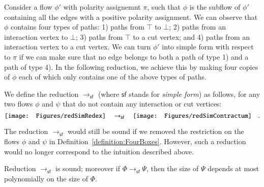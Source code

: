 Consider a flow $\phi'$ with polarity assignemnt $\pi$, such that $\phi$ is the subflow of $\phi'$ containing all the edges with a positive polarity assignment. We can observe that $\phi$ contains four types of paths: 1) paths from $\top$ to $\bot$; 2) paths from an interaction vertex to $\bot$; 3) paths from $\top$ to a cut vertex; and 4) paths from an interaction vertex to a cut vertex. We can turn $\phi'$ into simple form with respect to $\pi$ if we can make sure that no edge belongs to both a path of type 1) and a path of type 4). In the following reduction, we achieve this by making four copies of $\phi$ each of which only contains one of the above types of paths.

\newcommand{\frfb}{{\mathsf{sf}}}
\begin{definition}\label{definition:FourBoxes}
We define the reduction $\to_\frfb$ (where $\frfb$ stands for \emph{simple form}) as follows, for any two flows $\phi$ and $\psi$ that do not contain any interaction or cut vertices:
\[
\vcenter{\hbox{\texttt{[image: Figures/redSimRedex]}}}
\quad\to_\frfb\quad
\vcenter{\hbox{\texttt{[image: Figures/redSimContractum]}}}
\quad.
\]
\end{definition}

\begin{remark}\label{remark:RestrictionFourBoxes}
The reduction $\to_\frfb$ would still be sound if we removed the restriction on the flows $\phi$ and $\psi$ in Definition~\vref{definition:FourBoxes}. However, such a reduction would no longer correspond to the intuition described above.
\end{remark}

\begin{theorem}\label{theorem:SoundFourBoxes}
Reduction\/ $\to_\frfb$ is sound; moreover if $\Phi\to_\frfb\Psi$, then the size of $\Psi$ depends at most polynomially on the size of $\Phi$.
\end{theorem}

